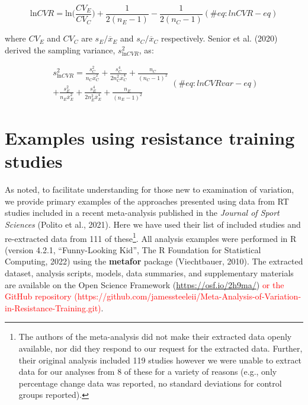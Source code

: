 \documentclass[
]{article}
\begin{document}
\begin{equation}
\textrm{ln}CVR=\textrm{ln}\biggl(\frac{CV_{E}}{CV_{C}}\biggl)+\frac{1}{2(n_{E}-1)}-\frac{1}{2(n_{C}-1)}
(\#eq:lnCVR-eq)
\end{equation}

where \(CV_{E}\) and \(CV_{C}\) are \({s_{E}}/{\overline{x}_{E}}\) and \({s_{C}}/{\overline{x}_{C}}\) respectively. Senior et al. (2020) derived the sampling variance, \(s^2_{\textrm{ln}CVR}\), as:

\begin{equation}
\begin{split}
s^2_{\textrm{ln}CVR}=\frac{s_{C}^2}{n_{C}\overline{x}_{C}^2}+\frac{s_{C}^4}{2n_{C}^2\overline{x}_{C}^4}+\frac{n_{C}}{(n_{C}-1)^2} \\
+\frac{s_{E}^2}{n_{E}\overline{x}_{E}^2}+\frac{s_{E}^4}{2n_{E}^2\overline{x}_{E}^4}+\frac{n_{E}}{(n_{E}-1)^2}
\end{split}
(\#eq:lnCVRvar-eq)
\end{equation}

\hypertarget{examples-using-resistance-training-studies}{%
\section{Examples using resistance training studies}\label{examples-using-resistance-training-studies}}

As noted, to facilitate understanding for those new to examination of variation, we provide primary examples of the approaches presented using data from RT studies included in a recent meta-analysis published in the \emph{Journal of Sport Sciences} (Polito et al., 2021). Here we have used their list of included studies and re-extracted data from 111 of these\footnote{The authors of the meta-analysis did not make their extracted data openly available, nor did they respond to our request for the extracted data. Further, their original analysis included 119 studies however we were unable to extract data for our analyses from 8 of these for a variety of reasons (e.g., only percentage change data was reported, no standard deviations for control groups reported).}. All analysis examples were performed in R (version 4.2.1, ``Funny-Looking Kid'', The R Foundation for Statistical Computing, 2022) using the \textbf{metafor} package (Viechtbauer, 2010). The extracted dataset, analysis scripts, models, data summaries, and supplementary materials are available on the Open Science Framework (\url{https://osf.io/2h9ma/}) \textcolor{red}{or the GitHub repository (https://github.com/jamessteeleii/Meta-Analysis-of-Variation-in-Resistance-Training.git)}.
\end{document}

